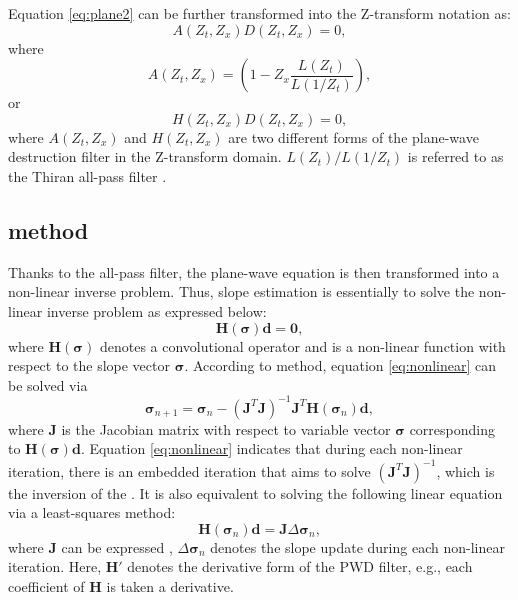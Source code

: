 Equation \ref{eq:plane2} can be further transformed into the Z-transform notation as: 
\begin{equation}
\label{eq:Z}
A(Z_t,Z_x) D(Z_t,Z_x) = 0,
\end{equation}
where 
\begin{equation}
\label{eq:Z1}
A(Z_t,Z_x) = (1-Z_x\frac{L(Z_t)}{L(1/Z_t)}),
\end{equation}
or 
\begin{equation}
\label{eq:Z2}
H(Z_t,Z_x) D(Z_t,Z_x) = 0,
\end{equation}
where 
$A(Z_t,Z_x)$ and $H(Z_t,Z_x)$ are two different forms of the plane-wave destruction filter in the Z-transform domain. $L(Z_t)/L(1/Z_t)$ is referred to as the Thiran all-pass filter \cite[]{thiran1971recursive,fomel2002pwd,zhonghuan2013accelerated}. 

\subsection{ method}
Thanks to the all-pass filter, the plane-wave equation is then transformed into a non-linear inverse problem. Thus, slope estimation is essentially to solve the non-linear inverse problem as expressed below:
\begin{equation}
\label{eq:nonlinear}
\mathbf{H}(\boldsymbol{\sigma})\mathbf{d}=\mathbf{0},
\end{equation}
where $\mathbf{H}(\boldsymbol{\sigma})$ denotes a convolutional operator and is a non-linear function with respect to the slope vector $\boldsymbol{\sigma}$. According to  method, equation \ref{eq:nonlinear} can be solved via
\begin{equation}
\label{eq:nonlinear2}
\boldsymbol{\sigma}_{n+1}=\boldsymbol{\sigma}_n-(\mathbf{J}^T\mathbf{J})^{-1}\mathbf{J}^T\mathbf{H}(\boldsymbol{\sigma}_n)\mathbf{d},
\end{equation}
where $\mathbf{J}$ is the Jacobian matrix with respect to variable vector $\boldsymbol{\sigma}$ corresponding to $\mathbf{H}(\boldsymbol{\sigma})\mathbf{d}$. Equation \ref{eq:nonlinear} indicates that during each non-linear iteration, there is an embedded iteration that aims to solve $(\mathbf{J}^T\mathbf{J})^{-1}$, which is the inversion of the . It is also equivalent to solving the following linear equation via a least-squares method:
\begin{equation}
\label{eq:nonlinear3}
\mathbf{H}(\boldsymbol{\sigma}_n)\mathbf{d} = \mathbf{J} \Delta \boldsymbol{\sigma}_n,
\end{equation}
where $\mathbf{J}$ can be expressed , $ \Delta \boldsymbol{\sigma}_n$ denotes the slope update during each non-linear iteration.  Here, $\mathbf{H}'$ denotes the derivative form of the PWD filter, e.g., each coefficient of $\mathbf{H}$ is taken a derivative.

